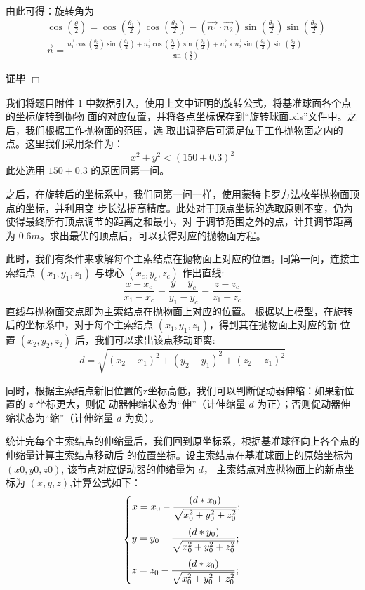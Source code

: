 \documentclass[withoutpreface,bwprint]{cumcmthesis} %
\begin{document}
由此可得：旋转角为
\[
    \begin{split}
        &\cos(\frac{\theta}{2}) = \cos(\frac{\theta _1}{2})
        \cos(\frac{\theta _2}{2}) - (\overrightarrow{n_1} \cdot 
        \overrightarrow{n_2})\sin(\frac{\theta _1}{2})
        \sin(\frac{\theta _2}{2}) \\
        &\overrightarrow{n} = \frac{\displaystyle \overrightarrow{n_1}
        \cos(\frac{\theta _2}{2})\sin(\frac{\theta _1}{2}) + 
        \overrightarrow{n_2}\cos(\frac{\theta _1}{2})
        \sin(\frac{\theta _2}{2}) + \overrightarrow{n_1} \times 
        \overrightarrow{n_2}\sin(\frac{\theta _1}{2})
        \sin(\frac{\theta _2}{2})}
        {\displaystyle \sin(\frac{\theta}{2})} 
    \end{split}
\]\par
\textbf{证毕 $\Box$}

\medskip
\medskip
\medskip
我们将题目附件 $1$ 中数据引入，使用上文中证明的旋转公式，将基准球面各个点的坐标旋转到抛物
面的对应位置，并将各点坐标保存到“旋转球面.xls”文件中。之后，我们根据工作抛物面的范围，选
取出调整后可满足位于工作抛物面之内的点。这里我们采用条件为：
\[
    x^2+y^2<(150+0.3)^2
\]
此处选用 $150+0.3$ 的原因同第一问。

之后，在旋转后的坐标系中，我们同第一问一样，使用蒙特卡罗方法枚举抛物面顶点的坐标，并利用变
步长法提高精度。此处对于顶点坐标的选取原则不变，仍为使得最终所有顶点调节的距离之和最小，对
于调节范围之外的点，计其调节距离为 $0.6m$。求出最优的顶点后，可以获得对应的抛物面方程。

此时，我们有条件来求解每个主索结点在抛物面上对应的位置。同第一问，连接主索结点 $(x_1,y_1,z_1)$
与球心 $(x_c,y_c,z_c)$ 作出直线:
\[
    \frac{x-x_c}{x_1-x_c}=\frac{y-y_c}{y_1-y_c}=\frac{z-z_c}{z_1-z_c}
\]
直线与抛物面交点即为主索结点在抛物面上对应的位置。
根据以上模型，在旋转后的坐标系中，对于每个主索结点 $(x_1,y_1,z_1)$，得到其在抛物面上对应的新
位置 $(x_2,y_2,z_2)$ 后，我们可以求出该点移动距离:
\[
    d = \sqrt{(x_2-x_1)^2+(y_2-y_1)^2+(z_2-z_1)^2}
\]

同时，根据主索结点新旧位置的z坐标高低，我们可以判断促动器伸缩：如果新位置的 $z$ 坐标更大，则促
动器伸缩状态为“伸”（计伸缩量 $d$ 为正）；否则促动器伸缩状态为“缩”（计伸缩量 $d$ 为负）。

统计完每个主索结点的伸缩量后，我们回到原坐标系，根据基准球径向上各个点的伸缩量计算主索结点移动后
的位置坐标。设主索结点在基准球面上的原始坐标为 $(x0, y0, z0)$, 该节点对应促动器的伸缩量为 $d$，
主索结点对应抛物面上的新点坐标为 $(x, y,z)$,计算公式如下：
\[
    \begin{dcases}
        \smallskip
        x = x_0 - \frac{(d*x_0)}{\sqrt{x_0^2+y_0^2+z_0^2}}; \\
        \smallskip
        y = y_0 - \frac{(d*y_0)}{\sqrt{x_0^2+y_0^2+z_0^2}}; \\
        z = z_0 - \frac{(d*z_0)}{\sqrt{x_0^2+y_0^2+z_0^2}};
    \end{dcases}
\]
\end{document}
